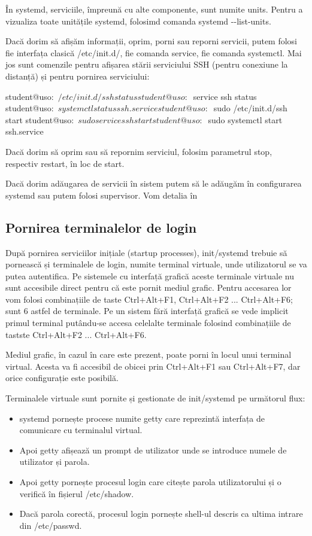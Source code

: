 În systemd, serviciile, împreună cu alte componente, sunt numite units. Pentru a
vizualiza toate unitățile systemd, folosimd comanda systemd -{}-list-units.

Dacă dorim să afișăm informații, oprim, porni sau reporni servicii, putem folosi
fie interfața clasică /etc/init.d/, fie comanda service, fie comanda systemctl.
Mai jos sunt comenzile pentru afișarea stării serviciului SSH (pentru conexiune
la distanță) și pentru pornirea serviciului:

\begin{screen}
student@uso:~$ /etc/init.d/ssh status
student@uso:~$ service ssh status
student@uso:~$ systemctl status ssh.service
student@uso:~$ sudo /etc/init.d/ssh start
student@uso:~$ sudo service ssh start
student@uso:~$ sudo systemctl start ssh.service
\end{screen}

Dacă dorim să oprim sau să repornim serviciul, folosim parametrul stop,
respectiv restart, în loc de start.

Dacă dorim adăugarea de servicii în sistem putem să le adăugăm în configurarea
systemd sau putem folosi supervisor. Vom detalia în

\subsection{Pornirea terminalelor de login}
\label{sec:boot-init-linux-login}

După pornirea serviciilor inițiale (startup processes), init/systemd trebuie să
pornească și terminalele de login, numite terminal virtuale, unde utilizatorul
se va putea autentifica. Pe sistemele cu interfață grafică aceste terminale
virtuale nu sunt accesibile direct pentru că este pornit mediul grafic. Pentru
accesarea lor vom folosi combinațiile de taste Ctrl+Alt+F1, Ctrl+Alt+F2 ...
Ctrl+Alt+F6; sunt 6 astfel de terminale. Pe un sistem fără interfață grafică se
vede implicit primul terminal putându-se accesa celelalte terminale folosind
combinațiile de tastste Ctrl+Alt+F2 ... Ctrl+Alt+F6.

Mediul grafic, în cazul în care este prezent, poate porni în locul unui terminal
virtual. Acesta va fi accesibil de obicei prin Ctrl+Alt+F1 sau Ctrl+Alt+F7, dar
orice configurație este posibilă.

Terminalele virtuale sunt pornite și gestionate de init/systemd pe următorul flux:

\begin{itemize}
	\item systemd pornește procese numite getty care reprezintă interfața de
		comunicare cu terminalul virtual.
	\item Apoi getty afișează un prompt de utilizator unde se introduce
		numele de utilizator și parola.
	\item Apoi getty pornește procesul login care citește parola
		utilizatorului și o verifică în fișierul /etc/shadow.
	\item Dacă parola corectă, procesul login pornește shell-ul descris ca
		ultima intrare din /etc/passwd.
\end{itemize}

